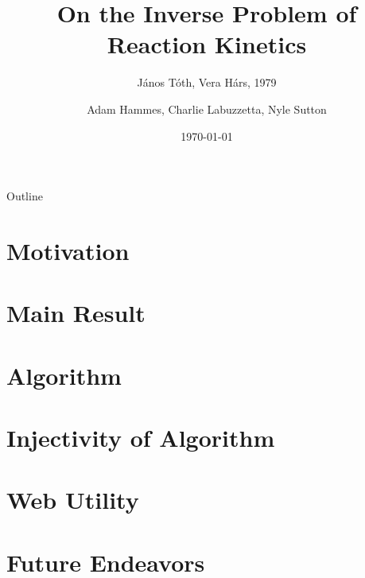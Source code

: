 \documentclass[11pt]{beamer}
\title{On the Inverse Problem of Reaction Kinetics}
\subtitle{J{\'a}nos T{\'o}th, Vera H{\'a}rs, 1979}
\author{Adam Hammes, Charlie Labuzzetta, Nyle Sutton}
\institute{Iowa State University}
\date{\today}
\begin{document}
	
	\begin{frame}
		\titlepage
	\end{frame}
	
	\begin{frame}{Outline}
		\tableofcontents
	\end{frame}
	
	\section{Motivation}
	
	
	\section{Main Result}
	
	
	
	
	
	\section{Algorithm}
	
	
	\section{Injectivity of Algorithm}

	
	
	


	
	\section{Web Utility}
	

	\section{Future Endeavors}
		
\end{document}
